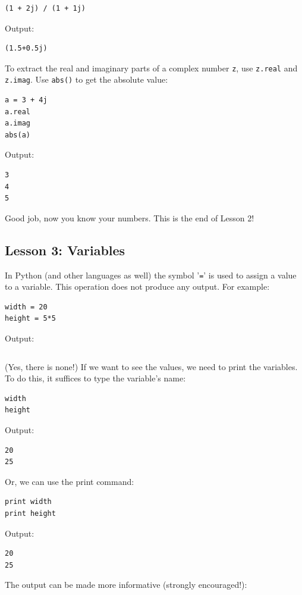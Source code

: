 \documentclass[article,A4,12pt]{llncs}
\begin{document}
\begin{verbatim}
(1 + 2j) / (1 + 1j)
\end{verbatim}
Output:

\begin{verbatim}
(1.5+0.5j)
\end{verbatim}
To extract the real and imaginary parts of a complex number {\tt z}, use {\tt z.real}
and {\tt z.imag}. Use {\tt abs()} to get the absolute value:

\begin{verbatim}
a = 3 + 4j
a.real
a.imag
abs(a)
\end{verbatim}
Output:

\begin{verbatim}
3
4
5
\end{verbatim}
Good job, now you know your numbers. This is the end of Lesson 2!


\subsection{Lesson 3: Variables}

In Python (and other languages as well) the symbol '{\tt =}' is used to assign 
a value to a variable. This operation does not produce any output. For
example:

\begin{verbatim}
width = 20
height = 5*5
\end{verbatim}
Output:

\begin{verbatim}

\end{verbatim}
(Yes, there is none!) If we want to see the values, we need to print the 
variables. To do this, it suffices to type the variable's name:

\begin{verbatim}
width
height
\end{verbatim}
Output:

\begin{verbatim}
20
25
\end{verbatim}
Or, we can use the print command:

\begin{verbatim}
print width
print height
\end{verbatim}
Output:

\begin{verbatim}
20
25
\end{verbatim}
The output can be made more informative (strongly encouraged!):
\end{document}
